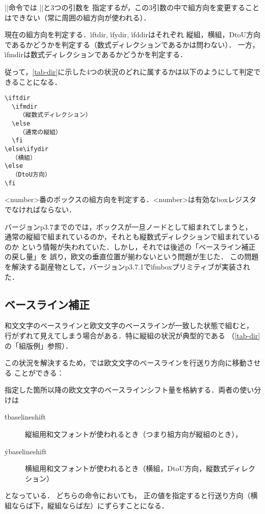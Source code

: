 \documentclass[a4paper,11pt,nomag,dvipdfmx]{jsarticle}
\begin{document}
\begin{dangerous}
 |\discretionary|命令では
 |\discretionary|と3つの引数を
 指定するが，この3引数の中で組方向を変更することはできない（常に周囲の組方向が使われる）．
\end{dangerous}

\begin{cslist}
  現在の組方向を判定する．\.{iftdir}, \.{ifydir}, \.{ifddir}はそれぞれ
  縦組，横組，DtoU方向であるかどうかを判定する（数式ディレクションであるかは問わない）．
  一方，\.{ifmdir}は数式ディレクションであるかどうかを判定する．

  従って，\autoref{tab-dir}に示した4つの状況のどれに属するかは以下のようにして判定できることになる．
  \begin{verbatim}
\iftdir
  \ifmdir
    （縦数式ディレクション）
  \else
    （通常の縦組）
  \fi
\else\ifydir
  （横組）
\else
  （DtoU方向）
\fi
  \end{verbatim}

  <number>番のボックスの組方向を判定する．<number>は有効なboxレジスタでなければならない．

  バージョンp3.7までの\pTeX では，ボックスが一旦ノードとして組まれてしまうと，
  通常の縦組で組まれているのか，それとも縦数式ディレクションで組まれているのか
  という情報が失われていた．しかし，それでは後述の「ベースライン補正の戻し量」を
  誤り，欧文の垂直位置が揃わないという問題が生じた\cite{tatemath}．
  この問題を解決する副産物として，バージョンp3.7.1で\.{ifmbox}プリミティブが実装された．
\end{cslist}

\subsection{ベースライン補正}
\label{sec:baselineshift}
和文文字のベースラインと欧文文字のベースラインが一致した状態で組むと，
行がずれて見えてしまう場合がある．特に縦組の状況が典型的である
（\autoref{tab-dir}の「組版例」参照）．

この状況を解決するため，\pTeX では欧文文字のベースラインを行送り方向に移動させる
ことができる：

\begin{cslist}
\csitem[\.{tbaselineshift}=<dimen>, \.{ybaselineshift}=<dimen>]
 指定した箇所以降の欧文文字のベースラインシフト量を格納する．両者の使い分けは
 \begin{description}
  \item[\.{tbaselineshift}]
         縦組用和文フォントが使われるとき（つまり組方向が縦組のとき），
  \item[\.{ybaselineshift}]
         横組用和文フォントが使われるとき（横組，DtoU方向，縦数式ディレクション）
 \end{description}
 となっている．
 どちらの命令においても，
 正の値を指定すると行送り方向（横組ならば下，縦組ならば左）にずらすことになる．
\end{cslist}
\end{document}
